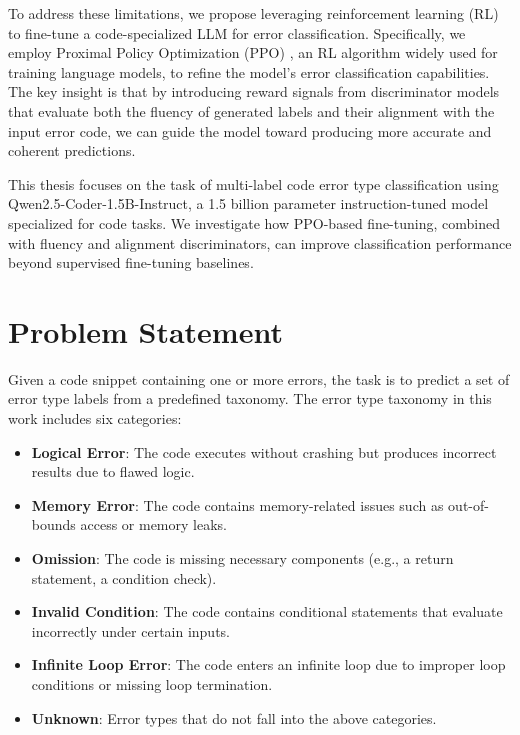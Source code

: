 To address these limitations, we propose leveraging reinforcement learning (RL) to fine-tune a code-specialized LLM for error classification. Specifically, we employ Proximal Policy Optimization (PPO) \cite{schulman2017proximal}, an RL algorithm widely used for training language models, to refine the model's error classification capabilities. The key insight is that by introducing reward signals from discriminator models that evaluate both the fluency of generated labels and their alignment with the input error code, we can guide the model toward producing more accurate and coherent predictions.

This thesis focuses on the task of multi-label code error type classification using Qwen2.5-Coder-1.5B-Instruct, a 1.5 billion parameter instruction-tuned model specialized for code tasks. We investigate how PPO-based fine-tuning, combined with fluency and alignment discriminators, can improve classification performance beyond supervised fine-tuning baselines.

\section{Problem Statement}

Given a code snippet containing one or more errors, the task is to predict a set of error type labels from a predefined taxonomy. The error type taxonomy in this work includes six categories:

\begin{itemize}
    \item \textbf{Logical Error}: The code executes without crashing but produces incorrect results due to flawed logic.
    \item \textbf{Memory Error}: The code contains memory-related issues such as out-of-bounds access or memory leaks.
    \item \textbf{Omission}: The code is missing necessary components (e.g., a return statement, a condition check).
    \item \textbf{Invalid Condition}: The code contains conditional statements that evaluate incorrectly under certain inputs.
    \item \textbf{Infinite Loop Error}: The code enters an infinite loop due to improper loop conditions or missing loop termination.
    \item \textbf{Unknown}: Error types that do not fall into the above categories.
\end{itemize}

